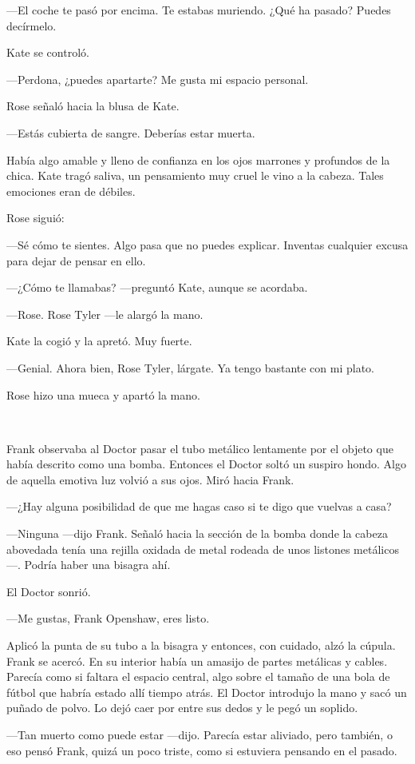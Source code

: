 ---El coche te pasó por encima. Te estabas muriendo. ¿Qué ha pasado?
Puedes decírmelo.

Kate se controló.

---Perdona, ¿puedes apartarte? Me gusta mi espacio personal.

Rose señaló hacia la blusa de Kate.

---Estás cubierta de sangre. Deberías estar muerta.

Había algo amable y lleno de confianza en los ojos marrones y profundos
de la chica. Kate tragó saliva, un pensamiento muy cruel le vino a la
cabeza. Tales emociones eran de débiles.

Rose siguió:

---Sé cómo te sientes. Algo pasa que no puedes explicar. Inventas
cualquier excusa para dejar de pensar en ello.

---¿Cómo te llamabas? ---preguntó Kate, aunque se acordaba.

---Rose. Rose Tyler ---le alargó la mano.

Kate la cogió y la apretó. Muy fuerte.

---Genial. Ahora bien, Rose Tyler, lárgate. Ya tengo bastante con mi
plato.

Rose hizo una mueca y apartó la mano.

~

Frank observaba al Doctor pasar el tubo metálico lentamente por el
objeto que había descrito como una bomba. Entonces el Doctor soltó un
suspiro hondo. Algo de aquella emotiva luz volvió a sus ojos. Miró hacia
Frank.

---¿Hay alguna posibilidad de que me hagas caso si te digo que vuelvas a
casa?

---Ninguna ---dijo Frank. Señaló hacia la sección de la bomba donde la
cabeza abovedada tenía una rejilla oxidada de metal rodeada de unos
listones metálicos---. Podría haber una bisagra ahí.

El Doctor sonrió.

---Me gustas, Frank Openshaw, eres listo.

Aplicó la punta de su tubo a la bisagra y entonces, con cuidado, alzó la
cúpula. Frank se acercó. En su interior había un amasijo de partes
metálicas y cables. Parecía como si faltara el espacio central, algo
sobre el tamaño de una bola de fútbol que habría estado allí tiempo
atrás. El Doctor introdujo la mano y sacó un puñado de polvo. Lo dejó
caer por entre sus dedos y le pegó un soplido.

---Tan muerto como puede estar ---dijo. Parecía estar aliviado, pero
también, o eso pensó Frank, quizá un poco triste, como si estuviera
pensando en el pasado.

